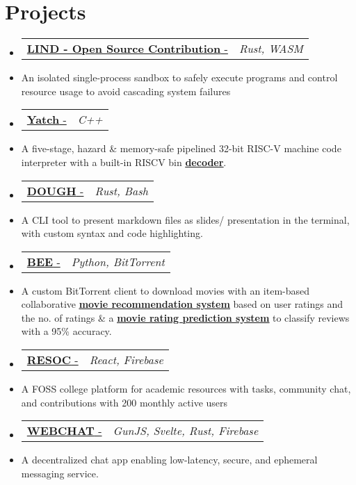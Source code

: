 \documentclass[letterpaper,10pt]{article}
\makeatletter
\newcommand{\resumeItem}[1]{
  \item\small{
    {#1 \vspace{-2pt}}
  }
}
\newcommand{\resumeProjectHeading}[2]{
    \item
    \begin{tabular*}{0.97\textwidth}{l@{\extracolsep{\fill}}r}
      \small#1 & \textit{\small #2} \\
    \end{tabular*}\vspace{-4 pt}
}
\newcommand{\resumeSubItem}[1]{\resumeItem{#1}\vspace{-4pt}}
\newcommand{\resumeSubHeadingListStart}{\begin{itemize}[leftmargin=0.15in, label={}]}
\newcommand{\resumeSubHeadingListEnd}{\end{itemize}}
\makeatother
\begin{document}


\section{Projects}
  \resumeSubHeadingListStart
  \resumeProjectHeading
    {\href{https://github.com/Lind-Project/lind_project}{\textbf{LIND - Open Source Contribution} - \faIcon{link}}}{Rust, WASM}
    \resumeSubItem
      {An isolated single-process sandbox to safely execute programs and control resource usage to avoid cascading system failures}
\resumeProjectHeading
  {\href{https://github.com/fuzzymf/yatch}{\textbf{Yatch} - \faIcon{link}}}{C++}
    \resumeSubItem
      {A five-stage, hazard \& memory-safe pipelined 32-bit RISC-V machine code interpreter with a built-in RISCV bin {\href{https://anubhavp.dev/barney}{\underline{\textbf{decoder}}}}.}
  \resumeProjectHeading
    {\href{https://github.com/fuzzymf/dough}{\textbf{DOUGH} - \faIcon{link}}}{Rust, Bash}
    \resumeSubItem
      {A CLI tool to present markdown files as slides/ presentation in the terminal, with custom syntax and code highlighting.}
  \resumeProjectHeading
    {\href{https://github.com/fuzzymf/b}{{\textbf{BEE} - \faIcon{link} }}}{Python, BitTorrent}
    \resumeSubItem
      {A custom BitTorrent client to download movies with an item-based collaborative \href{https://github.com/fuzzymf/Movie-recommendation}{\underline{\textbf{ movie recommendation system}}} based on user ratings and the no. of ratings \& a \href{https://github.com/fuzzymf/Movie-rating-prediction}{\underline{\textbf{movie rating prediction system}}} to classify reviews with a 95\% accuracy.}
  \resumeProjectHeading
    {\href{https://github.com/fuzzymf/resoc}{\textbf{RESOC} - \faIcon{link} }}{React, Firebase}
    \resumeSubItem
      {A FOSS college platform for academic resources with tasks, community chat, and contributions with 200 monthly active users}
    \resumeProjectHeading
    {\href{https://github.com/fuzzymf/w3bchat-dapp}{\textbf{WEBCHAT} - \faIcon{link}}}{GunJS, Svelte, Rust, Firebase}
    \resumeSubItem
      {A decentralized chat app enabling low-latency, secure, and ephemeral messaging service.}
  \resumeSubHeadingListEnd

%
\end{document}
